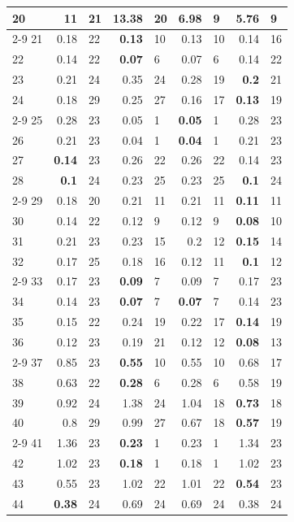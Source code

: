 \begin{longtable}{lr@{\hskip 4pt}l@{\hskip 12pt}r@{\hskip 4pt}l@{\hskip 12pt}r@{\hskip 4pt}l@{\hskip 12pt}r@{\hskip 4pt}l@{\hskip 12pt}}
20 & 11 & 21 & 13.38 & 20 & 6.98 & 9 & \textbf{5.76} & 9 \\
\cmidrule{2-9}
21 & 0.18 & 22 & \textbf{0.13} & 10 & 0.13 & 10 & 0.14 & 16 \\
22 & 0.14 & 22 & \textbf{0.07} & 6 & 0.07 & 6 & 0.14 & 22 \\
23 & 0.21 & 24 & 0.35 & 24 & 0.28 & 19 & \textbf{0.2} & 21 \\
24 & 0.18 & 29 & 0.25 & 27 & 0.16 & 17 & \textbf{0.13} & 19 \\
\cmidrule{2-9}
25 & 0.28 & 23 & 0.05 & 1 & \textbf{0.05} & 1 & 0.28 & 23 \\
26 & 0.21 & 23 & 0.04 & 1 & \textbf{0.04} & 1 & 0.21 & 23 \\
27 & \textbf{0.14} & 23 & 0.26 & 22 & 0.26 & 22 & 0.14 & 23 \\
28 & \textbf{0.1} & 24 & 0.23 & 25 & 0.23 & 25 & \textbf{0.1} & 24 \\
\cmidrule{2-9}
29 & 0.18 & 20 & 0.21 & 11 & 0.21 & 11 & \textbf{0.11} & 11 \\
30 & 0.14 & 22 & 0.12 & 9 & 0.12 & 9 & \textbf{0.08} & 10 \\
31 & 0.21 & 23 & 0.23 & 15 & 0.2 & 12 & \textbf{0.15} & 14 \\
32 & 0.17 & 25 & 0.18 & 16 & 0.12 & 11 & \textbf{0.1} & 12 \\
\cmidrule{2-9}
33 & 0.17 & 23 & \textbf{0.09} & 7 & 0.09 & 7 & 0.17 & 23 \\
34 & 0.14 & 23 & \textbf{0.07} & 7 & \textbf{0.07} & 7 & 0.14 & 23 \\
35 & 0.15 & 22 & 0.24 & 19 & 0.22 & 17 & \textbf{0.14} & 19 \\
36 & 0.12 & 23 & 0.19 & 21 & 0.12 & 12 & \textbf{0.08} & 13 \\
\cmidrule{2-9}
37 & 0.85 & 23 & \textbf{0.55} & 10 & 0.55 & 10 & 0.68 & 17 \\
38 & 0.63 & 22 & \textbf{0.28} & 6 & 0.28 & 6 & 0.58 & 19 \\
39 & 0.92 & 24 & 1.38 & 24 & 1.04 & 18 & \textbf{0.73} & 18 \\
40 & 0.8 & 29 & 0.99 & 27 & 0.67 & 18 & \textbf{0.57} & 19 \\
\cmidrule{2-9}
41 & 1.36 & 23 & \textbf{0.23} & 1 & 0.23 & 1 & 1.34 & 23 \\
42 & 1.02 & 23 & \textbf{0.18} & 1 & 0.18 & 1 & 1.02 & 23 \\
43 & 0.55 & 23 & 1.02 & 22 & 1.01 & 22 & \textbf{0.54} & 23 \\
44 & \textbf{0.38} & 24 & 0.69 & 24 & 0.69 & 24 & 0.38 & 24 \\

\end{longtable}
